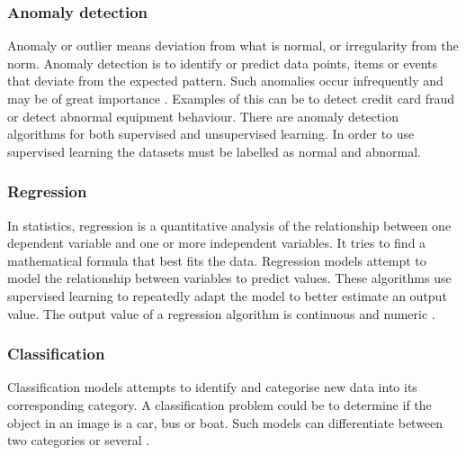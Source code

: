 \documentclass[english, a4paper]{report}
\begin{document}
{{{            \subsubsection{Anomaly detection}\label{anomaly detection}
            {
                Anomaly or outlier means deviation from what is normal, or irregularity from the norm. Anomaly detection is to identify or predict data points, items or events that deviate from the expected pattern. Such anomalies occur infrequently and may be of great importance \cite{mlMarsland}. Examples of this can be to detect credit card fraud or detect abnormal equipment behaviour. There are anomaly detection algorithms for both supervised and unsupervised learning. In order to use supervised learning the datasets must be labelled as normal and abnormal.
            }
            
            \subsubsection{Regression}\label{regressionTheory}
            {
                In statistics, regression is a quantitative analysis of the relationship between one dependent variable and one or more independent variables. It tries to find a mathematical formula that best fits the data. Regression models attempt to model the relationship between variables to predict values. These algorithms use supervised learning to repeatedly adapt the model to better estimate an output value. The output value of a regression algorithm is continuous and numeric \cite{mlMarsland}.
            }
            
            \subsubsection{Classification}\label{classificationTheory}
            {
                Classification models attempts to identify and categorise new data into its corresponding category. A classification problem could be to determine if the object in an image is a car, bus or boat. Such models can differentiate between two categories or several \cite{mlMarsland}.
            }
        }
        
}}
\end{document}
